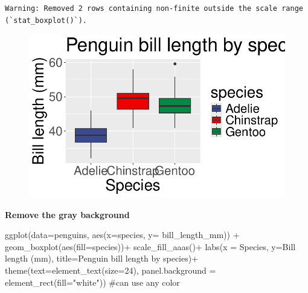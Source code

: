 \documentclass[
  letterpaper,
  DIV=11,
  numbers=noendperiod]{scrartcl}
\newenvironment{Shaded}{\begin{snugshade}}{\end{snugshade}}
\newcommand{\AttributeTok}[1]{\textcolor[rgb]{0.40,0.45,0.13}{#1}}
\newcommand{\CommentTok}[1]{\textcolor[rgb]{0.37,0.37,0.37}{#1}}
\newcommand{\DecValTok}[1]{\textcolor[rgb]{0.68,0.00,0.00}{#1}}
\newcommand{\FunctionTok}[1]{\textcolor[rgb]{0.28,0.35,0.67}{#1}}
\newcommand{\NormalTok}[1]{\textcolor[rgb]{0.00,0.23,0.31}{#1}}
\newcommand{\SpecialCharTok}[1]{\textcolor[rgb]{0.37,0.37,0.37}{#1}}
\newcommand{\StringTok}[1]{\textcolor[rgb]{0.13,0.47,0.30}{#1}}
\begin{document}
\begin{verbatim}
Warning: Removed 2 rows containing non-finite outside the scale range
(`stat_boxplot()`).
\end{verbatim}

\begin{figure}[H]

{\centering \includegraphics{Lab_2_files/figure-pdf/unnamed-chunk-44-1.pdf}

}

\end{figure}

\textbf{Remove the gray background}

\begin{Shaded}
\begin{Highlighting}[]
\FunctionTok{ggplot}\NormalTok{(}\AttributeTok{data=}\NormalTok{penguins, }\FunctionTok{aes}\NormalTok{(}\AttributeTok{x=}\NormalTok{species, }\AttributeTok{y=}\NormalTok{ bill\_length\_mm)) }\SpecialCharTok{+}
  \FunctionTok{geom\_boxplot}\NormalTok{(}\FunctionTok{aes}\NormalTok{(}\AttributeTok{fill=}\NormalTok{species))}\SpecialCharTok{+}
  \FunctionTok{scale\_fill\_aaas}\NormalTok{()}\SpecialCharTok{+}
  \FunctionTok{labs}\NormalTok{(}\AttributeTok{x =} \StringTok{\textquotesingle{}Species\textquotesingle{}}\NormalTok{, }\AttributeTok{y=}\StringTok{\textquotesingle{}Bill length (mm)\textquotesingle{}}\NormalTok{, }\AttributeTok{title=}\StringTok{\textquotesingle{}Penguin bill length by species\textquotesingle{}}\NormalTok{)}\SpecialCharTok{+}
  \FunctionTok{theme}\NormalTok{(}\AttributeTok{text=}\FunctionTok{element\_text}\NormalTok{(}\AttributeTok{size=}\DecValTok{24}\NormalTok{), }\AttributeTok{panel.background =} \FunctionTok{element\_rect}\NormalTok{(}\AttributeTok{fill=}\StringTok{"white"}\NormalTok{)) }\CommentTok{\#can use any color}
\end{Highlighting}
\end{Shaded}
\end{document}
